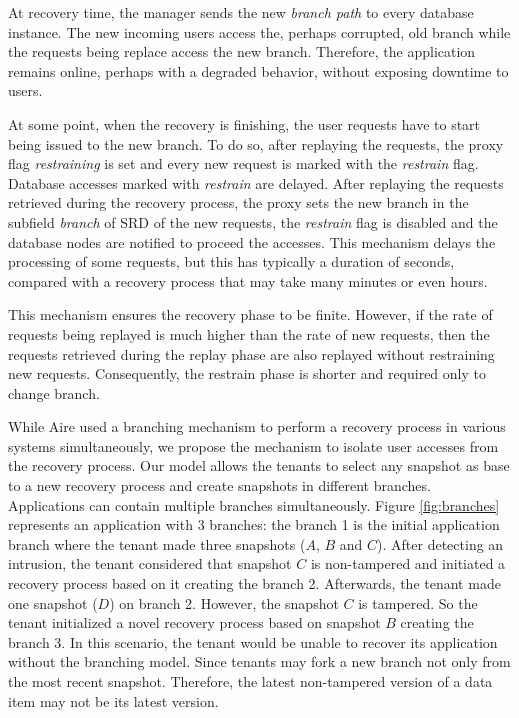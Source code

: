 At recovery time, the manager sends the new \emph{branch path} to every database instance. The new incoming users access the, perhaps corrupted, old branch while the requests being replace access the new branch. Therefore, the application remains online, perhaps with a degraded behavior, without exposing downtime to users. 

At some point, when the recovery is finishing, the user requests have to start being issued to the new branch. To do so, after replaying the requests, the proxy flag \emph{restraining} is set and every new request is marked with the \emph{restrain} flag. Database accesses marked with \emph{restrain} are delayed. After replaying the requests retrieved during the recovery process, the proxy sets the new branch in the subfield \emph{branch} of \ac{SRD} of the new requests, the \emph{restrain} flag is disabled and the database nodes are notified to proceed the accesses. This mechanism delays the processing of some requests, but this has typically a duration of seconds, compared with a recovery process that may take many minutes or even hours. 

This mechanism ensures the recovery phase to be finite. However, if the rate of requests being replayed is much higher than the rate of new requests, then the requests retrieved during the replay phase are also replayed without restraining new requests. Consequently, the restrain phase is shorter and required only to change branch. 

While Aire \cite{retro} used a branching mechanism to perform a recovery process in various systems simultaneously, we propose the mechanism to isolate user accesses from the recovery process. Our model allows the tenants to select any snapshot as base to a new recovery process and create snapshots in different branches. Applications can contain multiple branches simultaneously. Figure \ref{fig:branches} represents an application with 3 branches: the branch 1 is the initial application branch where the tenant made three snapshots ($A$, $B$ and $C$). After detecting an intrusion, the tenant considered that snapshot $C$ is non-tampered and initiated a recovery process based on it creating the branch 2. Afterwards, the tenant made one snapshot ($D$) on branch 2. However, the snapshot $C$ is tampered. So the tenant initialized a novel recovery process based on snapshot $B$ creating the branch 3. In this scenario, the tenant would be unable to recover its application without the branching model. Since tenants may fork a new branch not only from the most recent snapshot. Therefore, the latest non-tampered version of a data item may not be its latest version.

